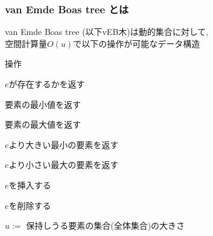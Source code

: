 \documentclass[main]{subfiles}
\begin{document}
\begin{frame}\frametitle{van Emde Boas tree とは}
	van Emde Boas tree (以下vEB木)は動的集合に対して,\\空間計算量$O(u)$で以下の操作が可能なデータ構造
\begin{block}{操作}
\begin{description}
\setlength{\labelwidth}{15ex}
\setlength{\itemindent}{8ex}
\item[$\func{member}(e)$]		$e$が存在するかを返す\\
\item[$\min()$]			要素の最小値を返す\\
\item[$\max()$]			要素の最大値を返す\\
\item[$\func{successor}(e)$]	$e$より大きい最小の要素を返す\\
\item[$\func{predecessor}(e)$]	$e$より小さい最大の要素を返す\\
\item[$\func{insert}(e)$]		$e$を挿入する\\
\item[$\func{delete}(e)$]		$e$を削除する\\
\end{description}
\end{block}
\begin{block}{}
\end{block}
{\small $u :=$ 保持しうる要素の集合(全体集合)の大きさ}
\end{frame}
\end{document}
